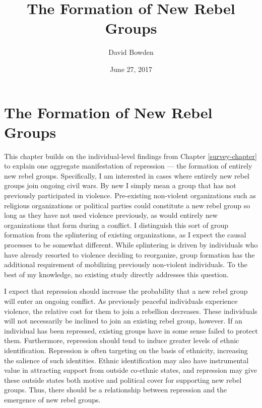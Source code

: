\documentclass[12pt,]{book}
\title{The Formation of New Rebel Groups}
\author{David Bowden}
\date{June 27, 2017}
\theoremstyle{definition}
\theoremstyle{definition}
\theoremstyle{remark}
\begin{document}
\maketitle

\doublespacing

\mainmatter

\chapter{The Formation of New Rebel Groups}\label{entry}

This chapter builds on the individual-level findings from Chapter
\ref{survey-chapter} to explain one aggregate manifestation of
repression --- the formation of entirely new rebel groups. Specifically,
I am interested in cases where entirely new rebel groups join ongoing
civil wars. By new I simply mean a group that has not previously
participated in violence. Pre-existing non-violent organizations such as
religious organizations or political parties could constitute a new
rebel group so long as they have not used violence previously, as would
entirely new organizations that form during a conflict. I distinguish
this sort of group formation from the splintering of existing
organizations, as I expect the causal processes to be somewhat
different. While splintering is driven by individuals who have already
resorted to violence deciding to reorganize, group formation has the
additional requirement of mobilizing previously non-violent individuals.
To the best of my knowledge, no existing study directly addresses this
question.

I expect that repression should increase the probability that a new
rebel group will enter an ongoing conflict. As previously peaceful
individuals experience violence, the relative cost for them to join a
rebellion decreases. These individuals will not necessarily be inclined
to join an existing rebel group, however. If an individual has been
repressed, existing groups have in some sense failed to protect them.
Furthermore, repression should tend to induce greater levels of ethnic
identification. Repression is often targeting on the basis of ethnicity,
increasing the salience of such identities. Ethnic identification may
also have instrumental value in attracting support from outside
co-ethnic states, and repression may give these outside states both
motive and political cover for supporting new rebel groups. Thus, there
should be a relationship between repression and the emergence of new
rebel groups.
\end{document}
